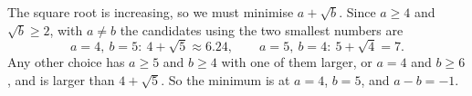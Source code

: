 The square root is increasing, so we must minimise $a+\sqrt b$. Since $a\ge4$ and $\sqrt b\ge2$, with $a\ne b$ the candidates using the two smallest numbers are
\[
a=4,\ b=5:\ 4+\sqrt5\approx6.24,\qquad a=5,\ b=4:\ 5+\sqrt4=7 .
\]
Any other choice has $a\ge5$ and $b\ge4$ with one of them larger, or $a=4$ and $b\ge6$, and is larger than $4+\sqrt5$. So the minimum is at $a=4$, $b=5$, and $a-b=\boxed{-1}$.
